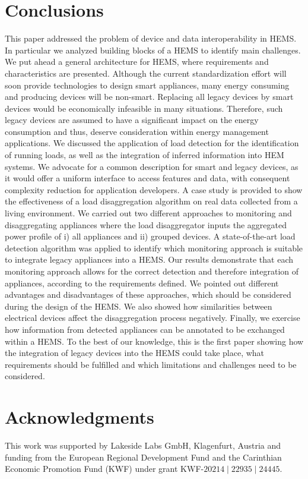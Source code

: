 \documentclass{article}
\begin{document}
\section{Conclusions}\label{sec:conclusion}
This paper addressed the problem of device and data interoperability in HEMS.
In particular we analyzed building blocks of a \ac{HEMS} to identify main challenges.
We put ahead a general architecture for \ac{HEMS}, where requirements and characteristics are presented.
Although the current standardization effort will soon provide technologies to design smart appliances, many energy consuming and producing devices will be non-smart. Replacing all legacy devices by smart devices would be economically infeasible in many situations. Therefore, such legacy devices are assumed to have a significant impact on the energy consumption and thus, deserve consideration within energy management applications.
We discussed the application of load detection for the identification of running loads, as well as the integration of inferred information into HEM systems.
We advocate for a common description for smart and legacy devices, as it would offer a uniform interface to access features and data, with consequent complexity reduction for application developers.
A case study is provided to show the effectiveness of a load disaggregation algorithm on real data collected from a living environment.
We carried out two different approaches to monitoring and disaggregating appliances where the load disaggregator inputs the aggregated power profile of i) all appliances and ii) grouped devices.
A state-of-the-art load detection algorithm was applied to identify which monitoring approach is suitable to integrate legacy appliances into a \ac{HEMS}.
Our results demonstrate that each monitoring approach allows for the correct detection and therefore integration of appliances, according to the requirements defined.
We pointed out different advantages and disadvantages of these approaches, which should be considered during the design of the \ac{HEMS}.
We also showed how similarities between electrical devices affect the disaggregation process negatively.
Finally, we exercise how information from detected appliances can be annotated to be exchanged within a \ac{HEMS}.
To the best of our knowledge, this is the first paper showing how the integration of legacy devices into the \ac{HEMS} could take place, what requirements should be fulfilled and which limitations and challenges need to be considered.

\section{Acknowledgments}
This work was supported by Lakeside Labs GmbH, Klagenfurt, Austria and funding from the European Regional Development Fund and the Carinthian Economic Promotion Fund (KWF) under grant KWF-$20214\mid22935\mid24445$. 




\end{document}
